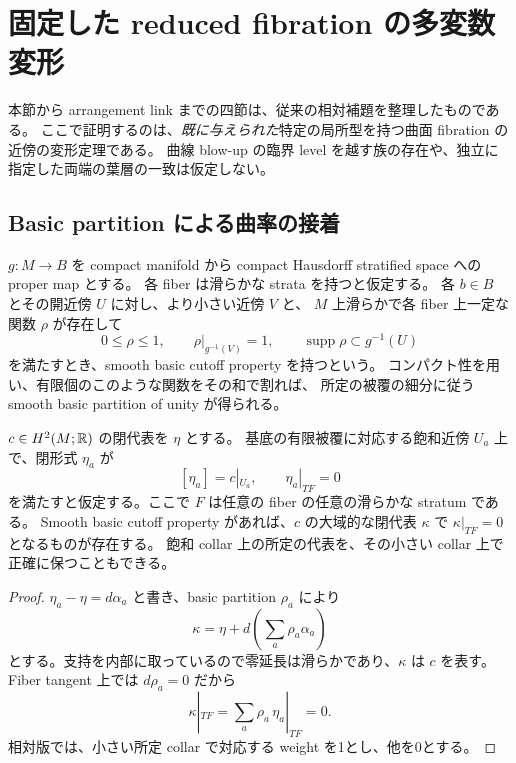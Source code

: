 \section{固定した reduced fibration の多変数変形}\label{sec:deformation}

本節から arrangement link までの四節は、従来の相対補題を整理したものである。
ここで証明するのは、\emph{既に与えられた}特定の局所型を持つ曲面 fibration の近傍の変形定理である。
曲線 blow-up の臨界 level を越す族の存在や、独立に指定した両端の葉層の一致は仮定しない。

\subsection{Basic partition による曲率の接着}

$g:M\to B$ を compact manifold から compact Hausdorff stratified space への proper map とする。
各 fiber は滑らかな strata を持つと仮定する。
各 $b\in B$ とその開近傍 $U$ に対し、より小さい近傍 $V$ と、
$M$ 上滑らかで各 fiber 上一定な関数 $\rho$ が存在して
\[
0\le\rho\le1,\qquad
\rho|_{g^{-1}(V)}=1,\qquad
\operatorname{supp}\rho\subset g^{-1}(U)
\]
を満たすとき、smooth basic cutoff property を持つという。
コンパクト性を用い、有限個のこのような関数をその和で割れば、
所定の被覆の細分に従う smooth basic partition of unity が得られる。

\begin{lemma}[葉方向に零となる代表の相対接着]\label{lem:basic}
$c\in H^2(M;\mathbb R)$ の閉代表を $\eta$ とする。
基底の有限被覆に対応する飽和近傍 $U_a$ 上で、閉形式 $\eta_a$ が
\[
[\eta_a]=c|_{U_a},\qquad
\eta_a|_{TF}=0
\]
を満たすと仮定する。ここで $F$ は任意の fiber の任意の滑らかな stratum である。
Smooth basic cutoff property があれば、$c$ の大域的な閉代表 $\kappa$ で
$\kappa|_{TF}=0$ となるものが存在する。
飽和 collar 上の所定の代表を、その小さい collar 上で正確に保つこともできる。
\end{lemma}

\begin{proof}
$\eta_a-\eta=d\alpha_a$ と書き、basic partition $\rho_a$ により
\begin{equation}\label{eq:basic-patch}
\kappa=\eta+d\left(\sum_a\rho_a\alpha_a\right)
\end{equation}
とする。支持を内部に取っているので零延長は滑らかであり、$\kappa$ は $c$ を表す。
Fiber tangent 上では $d\rho_a=0$ だから
\[
\kappa|_{TF}=\sum_a\rho_a\,\eta_a|_{TF}=0.
\]
相対版では、小さい所定 collar で対応する weight を1とし、他を0とする。
\end{proof}

